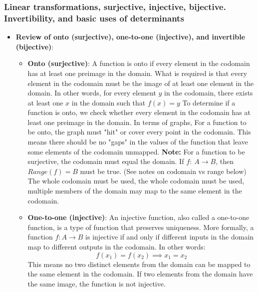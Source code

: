 \documentclass{report}
\begin{document}
\begin{itemize}
    \end{itemize}

    \pagebreak 
    \subsubsection{Linear transformations, surjective, injective, bijective. Invertibility, and basic uses of determinants}
    \begin{itemize}
                        \item \textbf{Review of onto (surjective), one-to-one (injective), and invertible (bijective)}:
                    \begin{itemize}
                        \item \textbf{Onto (surjective)}:  A function is onto if every element in the codomain has at least one preimage in the domain. What is required is that every element in the codomain must be the image of at least one element in the domain. In other words, for every element $y$ in the codomain, there exists at least one $x$ in the domain such that $f(x)=y$
                            \bigbreak \noindent 
                            To determine if a function is onto, we check whether every element in the codomain has at least one preimage in the domain. In terms of graphs, For a function to be onto, the graph must "hit" or cover every point in the codomain. This means there should be no "gaps" in the values of the function that leave some elements of the codomain unmapped.
                            \bigbreak \noindent 
                            \textbf{Note:} For a function to be surjective, the codomain must equal the domain. If $f:\ A \to B$, then $Range(f) = B$ must be true. (See notes on codomain vs range below)
                            \bigbreak \noindent 
                            The whole codomain must be used, the whole codomain must be used, multiple members of the domain may map to the same element in the codomain.
                        \item \textbf{One-to-one (injective)}: An injective function, also called a one-to-one function, is a type of function that preserves uniqueness. More formally, a function 
                            \( f: A \to B \) is injective if and only if different inputs in the domain map to different outputs in the codomain. In other words:
                            \[
                                f(x_1) = f(x_2) \implies x_1 = x_2
                            \]
                            \bigbreak \noindent 
                            This means no two distinct elements from the domain can be mapped to the same element in the codomain. If two elements from the domain have the same image, the function is not injective.

\end{itemize}
\end{itemize}
\end{document}

